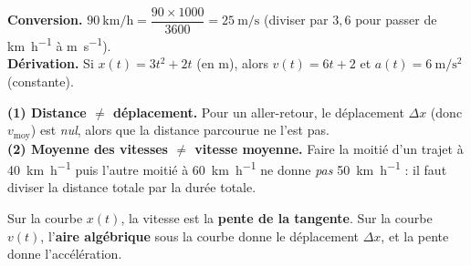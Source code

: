 \documentclass[11pt,a4paper]{article}
\begin{document}
\begin{exemplebox}
\textbf{Conversion.} $\qty{90}{\kilo\metre\per\hour}=\dfrac{90\times1000}{3600}=\qty{25}{\metre\per\second}$
(diviser par $3{,}6$ pour passer de \si{\kilo\metre\per\hour} à \si{\metre\per\second}).\\
\textbf{Dérivation.} Si $x(t)=3t^2+2t$ (en \si{\metre}), alors $v(t)=6t+2$ et $a(t)=6\ \si{\metre\per\second\squared}$ (constante).
\end{exemplebox}

\begin{piege}
\textbf{(1) Distance $\neq$ déplacement.} Pour un aller-retour, le déplacement $\Delta x$ (donc
$v_{\text{moy}}$) est \emph{nul}, alors que la distance parcourue ne l'est pas.\\
\textbf{(2) Moyenne des vitesses $\neq$ vitesse moyenne.} Faire la moitié d'un trajet à
\qty{40}{\kilo\metre\per\hour} puis l'autre moitié à \qty{60}{\kilo\metre\per\hour} ne donne
\emph{pas} \qty{50}{\kilo\metre\per\hour} : il faut diviser la distance totale par la durée totale.
\end{piege}

\begin{remarque}
Sur la courbe $x(t)$, la vitesse est la \textbf{pente de la tangente}. Sur la courbe $v(t)$,
l'\textbf{aire algébrique} sous la courbe donne le déplacement $\Delta x$, et la pente donne l'accélération.
\begin{center}
\end{center}
\end{remarque}
\end{document}
